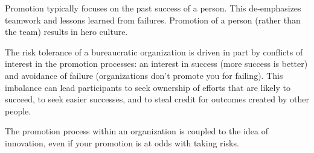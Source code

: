 Promotion typically focuses on the past success of a person. This de-emphasizes teamwork and lessons learned from failures. 
Promotion of a person (rather than the team) results in hero culture.


The risk tolerance of a bureaucratic organization is driven in part by conflicts of interest in the promotion processes: an interest in success (more success is better) and avoidance of failure (organizations don't promote you for failing). This imbalance can lead participants to seek ownership of efforts that are likely to succeed, to seek easier successes, and to steal credit for outcomes created by other people. 


The promotion process within an organization is coupled to the idea of innovation, even if your promotion is at odds with taking risks. 

